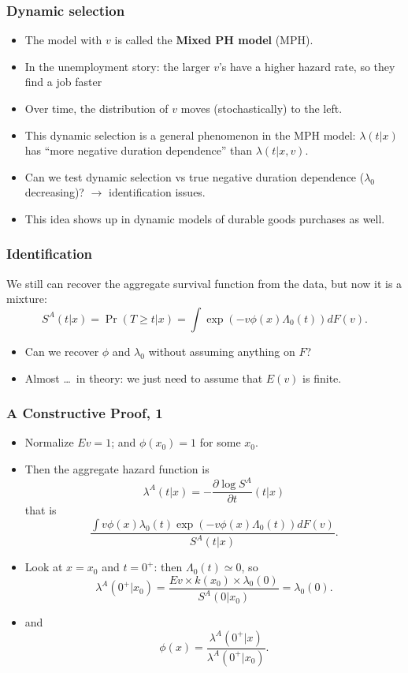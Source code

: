 \documentclass[aspectratio=169]{beamer}
\begin{document}
 \begin{frame}
 \frametitle{Dynamic selection}
\begin{itemize}
\item The model with $v$ is called the \textbf{Mixed PH model} (MPH).
\item In the unemployment story: the larger $v$'s have a higher hazard
  rate, so they find a job faster
\item Over time, the distribution of $v$ moves (stochastically) to the
  left.
\item This \alert{dynamic selection} is a general phenomenon in the MPH
  model: $\lambda(t \vert x)$ has ``more negative duration dependence'' than
  $\lambda(t \vert x,v)$.
\item Can we test dynamic selection vs true negative duration dependence
  ($\lambda_0$ decreasing)? $\rightarrow$ identification issues.
  \item This idea shows up in dynamic models of durable goods purchases as well.
  \end{itemize}
\end{frame}



\begin{frame}
\frametitle{Identification}
We still can recover the aggregate survival function from the data, but now it
is a mixture:
\[
S^A(t \vert x)=\Pr(T \geq t \vert x)=
\int \exp(-v \phi(x)\Lambda_0(t))dF(v).
\]
\begin{itemize}
\item Can we recover $\phi$ and $\lambda_0$ without assuming anything on $F$?
\item Almost \ldots\ in theory: we just need to assume that $E(v)$ is finite.
\end{itemize}
\end{frame}



\begin{frame}
\frametitle{A Constructive Proof, 1}
\begin{itemize}
\item Normalize $Ev=1$; and $\phi(x_0)=1$ for some $x_0$. 
\item Then the aggregate hazard function is
\[
\lambda^A(t \vert x)=-\frac{\partial \log S^A}{\partial t}(t \vert x)
\]
that is
\[
\frac{\int v \phi(x)\lambda_0(t)\exp(-v \phi(x)\Lambda_0(t))dF(v)}{S^A(t \vert x)}.
\]
\item
Look at $x=x_0$ and $t=0^+$: then $\Lambda_0(t) \simeq 0$, so
\[
\lambda^A(0^+\vert x_0)=\frac{Ev \times k(x_0) \times \lambda_0(0)}{S^A(0\vert x_0)}=\lambda_0(0).
\]
\item
and
\[
\phi(x)=\frac{\lambda^A(0^+ \vert x)}{\lambda^A(0^+ \vert x_0)}.
\]
\end{itemize}
\end{frame}
\end{document}
